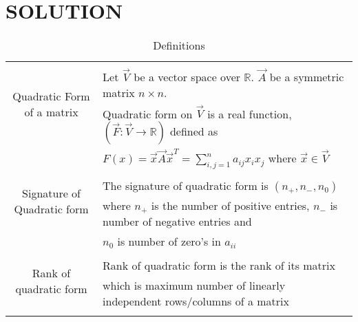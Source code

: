 \documentclass[journal,12pt]{IEEEtran}
\begin{document}
\section{SOLUTION}
\renewcommand{\thetable}{1}
\begin{longtable}{|c|l|}
    \hline
	\multirow{3}{*}{Quadratic Form of a matrix} 
	& \\
	& Let $\vec{V}$ be a vector space over $\mathbb{R}$. $\vec{A}$ be a symmetric matrix $n\times n$.\\& Quadratic form on $\vec{V}$ is a real function, $(\vec{F}:\vec{V}\rightarrow\mathbb{R})$ defined as 
	\\& $F(x)= \vec{x}\vec{A}\vec{x}^T= \sum_{i,j=1}^{n}a_{ij}x_ix_j$  where $\vec{x} \in \vec{V}$ \\

	\hline
	\multirow{3}{*}{Signature of Quadratic form} 
	& \\
	& The signature of quadratic form is $(n_{+},n_{-},n_{0})$ \\ & where $n_{+}$ is the number of positive entries, $n_{-}$ is number of negative entries and \\ & $n_{0}$ is number of zero's in $a_{ii}$ \\
	\hline
	\multirow{3}{*}{Rank of quadratic form} 
	& \\
	& Rank of quadratic form is the rank of its matrix \\
	& which is maximum number of linearly independent rows/columns of a matrix \\
	\hline
	\caption{Definitions}
    \label{Table.1}
\end{longtable}
 
\end{document}
